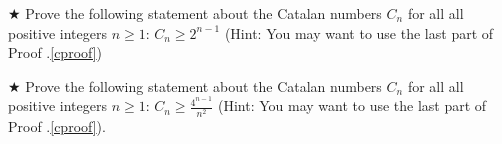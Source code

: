 \begin{proofp}$\bigstar$
Prove the following  statement about the Catalan numbers $C_n$ for all all positive integers $n \ge 1$: 
$C_n \ge 2^{n-1}$  (Hint: You may want to use the last part of Proof \thehomeworkcounter.\ref{cproof}) \\ 
\end{proofp}

\begin{proofp}$\bigstar$
Prove the following  statement about the Catalan numbers $C_n$ for all all positive integers $n \ge 1$: $C_n \ge \frac{4^{n-1}}{n^2}$ (Hint: You may want to use the last part of Proof \thehomeworkcounter.\ref{cproof}).
\end{proofp}
